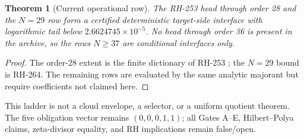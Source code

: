 \documentclass[11pt]{article}
\newtheorem{theorem}{Theorem}[section]
\begin{document}
\begin{theorem}[Current operational row]
The RH-253 head through order 28 and the $N=29$ row form a certified
deterministic target-side interface with logarithmic tail below
$2.6624745\times10^{-5}$.  No head through order 36 is present in the
archive, so the rows $N\ge37$ are conditional interfaces only.
\end{theorem}

\begin{proof}
The order-28 extent is the finite dictionary of RH-253 \citep{WangRH253};
the $N=29$ bound is RH-264.  The remaining rows are evaluated by the same
analytic majorant but require coefficients not claimed here.
\end{proof}

This ladder is not a cloud envelope, a selector, or a uniform quotient
theorem.  The five obligation vector remains $(0,0,0,1,1)$; all Gates A--E,
Hilbert--Polya claims, zeta-divisor equality, and RH implications remain
false/open.


\end{document}
